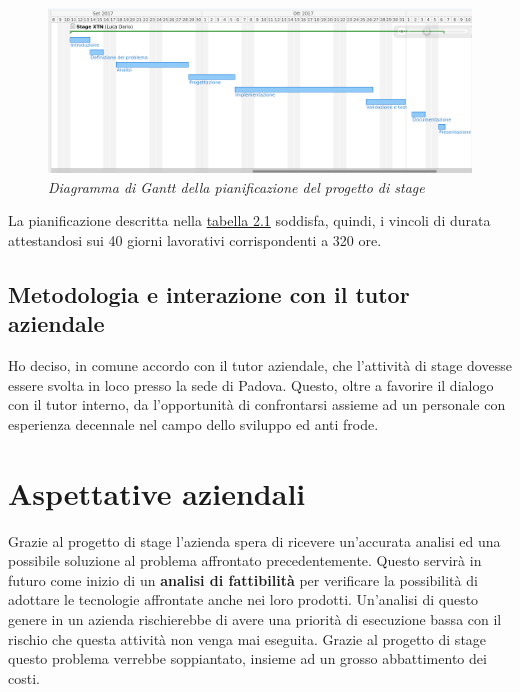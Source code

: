 \begin{figure}[h!]
	\includegraphics[scale=0.4]{immagini/gant.png}
	\caption{\textit{Diagramma di Gantt della pianificazione del progetto di stage}}
\end{figure}
La pianificazione descritta nella \hyperref[tab:pian]{tabella 2.1} soddisfa, quindi, i vincoli di durata attestandosi sui 40 giorni lavorativi corrispondenti a 320 ore.\\
\subsection{Metodologia e interazione con il tutor aziendale}
Ho deciso, in comune accordo con il tutor aziendale, che l'attività di stage dovesse essere svolta in loco presso la sede di Padova. Questo, oltre a favorire il dialogo con il tutor interno, da l'opportunità di confrontarsi assieme ad un personale con esperienza decennale nel campo dello sviluppo ed anti frode.
\newpage

\section{Aspettative aziendali}
Grazie al progetto di stage l'azienda spera di ricevere un'accurata analisi ed una possibile soluzione al problema affrontato precedentemente. Questo servirà in futuro come inizio di un \textbf{analisi di fattibilità} per verificare la possibilità di adottare le tecnologie affrontate anche nei loro prodotti. Un'analisi di questo genere in un azienda rischierebbe di avere una priorità di esecuzione bassa con il rischio che questa attività non venga mai eseguita. Grazie al progetto di stage questo problema verrebbe soppiantato, insieme ad  un grosso abbattimento dei costi.

